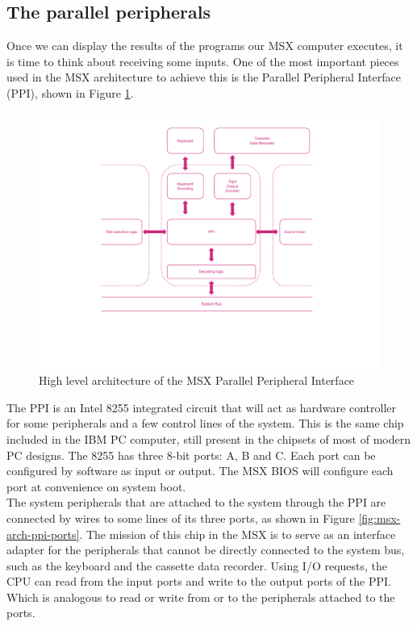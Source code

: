 \subsection{The parallel peripherals}

Once we can display the results of the programs our MSX computer executes, it is time to think about receiving some inputs. One of the most important pieces used in the MSX architecture to achieve this is the Parallel Peripheral Interface (PPI), shown in Figure \ref{fig:msx-arch-ppi}.\\

\begin{figure}
	\centering
	\includegraphics[width=1\linewidth,trim={0cm 100 0 100}]{images/figures/msx-arch-ppi}
	\caption{High level architecture of the MSX Parallel Peripheral Interface}
	\label{fig:msx-arch-ppi}
\end{figure}

The PPI is an Intel 8255 integrated circuit that will act as hardware controller for some peripherals and a few control lines of the system. This is the same chip included in the IBM PC computer, still present in the chipsets of most of modern PC designs. The 8255 has three 8-bit ports: A, B and C. Each port can be configured by software as input or output. The MSX BIOS will configure each port at convenience on system boot. \\

The system peripherals that are attached to the system through the PPI are connected by wires to some lines of its three ports, as shown in Figure \ref{fig:msx-arch-ppi-ports}. The mission of this chip in the MSX is to serve as an interface adapter for the peripherals that cannot be directly connected to the system bus, such as the keyboard and the cassette data recorder. Using I/O requests, the CPU can read from the input ports and write to the output ports of the PPI. Which is analogous to read or write from or to the peripherals attached to the ports.\\

